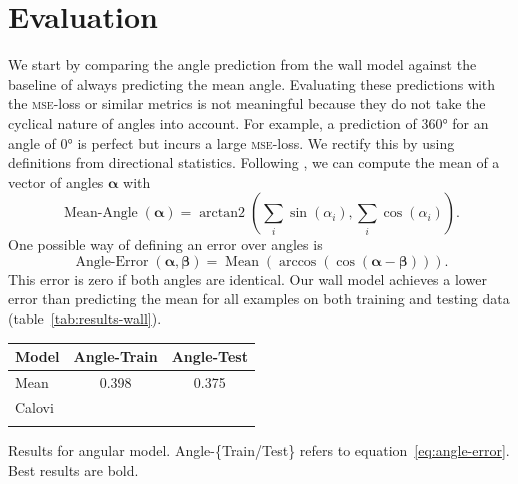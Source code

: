 \documentclass[nobib, a4paper]{tufte-handout}
\begin{document}
\section{Evaluation}
We start by comparing the angle prediction from the wall model against the baseline of always predicting the mean angle.
Evaluating these predictions with the \textsc{mse}-loss or similar metrics is not meaningful because they do not take the cyclical nature of angles into account.
For example, a prediction of \ang{360} for an angle of \ang{0} is perfect but incurs a large \textsc{mse}-loss.
We rectify this by using definitions from directional statistics\autocite{circularStatistics}.
Following \citeauthor{circularStatistics}, we can compute the mean of a vector of angles \(\bm{\alpha}\) with
\begin{equation*}
 \operatorname{Mean-Angle}(\bm{\alpha}) = \operatorname{arctan2} \left( \sum_i \sin \left( \alpha_i \right),  \sum_i \cos \left( \alpha_i \right)  \right).
\end{equation*}
One possible way of defining an error over angles is
\begin{equation}\label{eq:angle-error}
 \operatorname{Angle-Error}(\bm{\alpha}, \bm{\beta}) = \operatorname{Mean} \left( \operatorname{arccos} \left(  \cos  (\bm{\alpha} - \bm{\beta})  \right) \right).
\end{equation}
This error is zero if both angles are identical.
Our wall model achieves a lower error than predicting the mean for all examples on both training and testing data (table~\ref{tab:results-wall}).

\begin{margintable}
\centering
\begin{tabular}{@{}lS[table-format=1.3]S[table-format=1.3]@{}}
\toprule
{Model} & {Angle-Train} & {Angle-Test} \\ \midrule
Mean & 0.398 & 0.375 \\ 
  Calovi &  & \\ %
\bottomrule\\
\end{tabular}
\caption{Results for angular model.
  Angle-\{Train/Test\} refers to equation~\ref{eq:angle-error}.
  Best results are bold.
}
\label{tab:results-wall}
\end{margintable}
\end{document}
